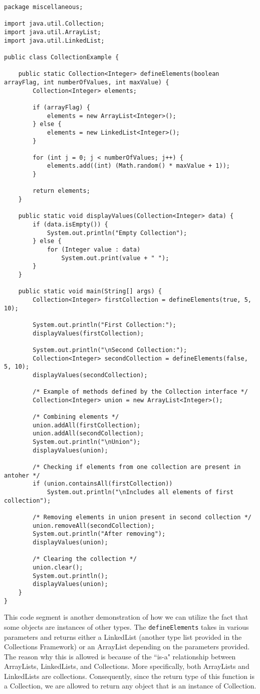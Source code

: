 \begin{lstlisting}
package miscellaneous;

import java.util.Collection;
import java.util.ArrayList;
import java.util.LinkedList;

public class CollectionExample {

	public static Collection<Integer> defineElements(boolean arrayFlag, int numberOfValues, int maxValue) {
		Collection<Integer> elements;

		if (arrayFlag) {
			elements = new ArrayList<Integer>();
		} else {
			elements = new LinkedList<Integer>();
		}

		for (int j = 0; j < numberOfValues; j++) {
			elements.add((int) (Math.random() * maxValue + 1));
		}

		return elements;
	}

	public static void displayValues(Collection<Integer> data) {
		if (data.isEmpty()) {
			System.out.println("Empty Collection");
		} else {
			for (Integer value : data)
				System.out.print(value + " ");
		}
	}

	public static void main(String[] args) {
		Collection<Integer> firstCollection = defineElements(true, 5, 10);

		System.out.println("First Collection:");
		displayValues(firstCollection);

		System.out.println("\nSecond Collection:");
		Collection<Integer> secondCollection = defineElements(false, 5, 10);
		displayValues(secondCollection);

		/* Example of methods defined by the Collection interface */
		Collection<Integer> union = new ArrayList<Integer>();

		/* Combining elements */
		union.addAll(firstCollection);
		union.addAll(secondCollection);
		System.out.println("\nUnion");
		displayValues(union);

		/* Checking if elements from one collection are present in antoher */
		if (union.containsAll(firstCollection))
			System.out.println("\nIncludes all elements of first collection");

		/* Removing elements in union present in second collection */
		union.removeAll(secondCollection);
		System.out.println("After removing");
		displayValues(union);

		/* Clearing the collection */
		union.clear();
		System.out.println();
		displayValues(union);
	}
}
\end{lstlisting}

This code segment is another demonstration of how we can utilize the fact that some objects are instances of other types. The \verb!defineElements! takes in various parameters and returns either a LinkedList (another type list provided in the Collections Framework) or an ArrayList depending on the parameters provided. The reason why this is allowed is because of the ``is-a" relationship between ArrayLists, LinkedLists, and Collections. More specifically, both ArrayLists and LinkedLists are collections. Consequently, since the return type of this function is a Collection, we are allowed to return any object that is an instance of Collection. 

